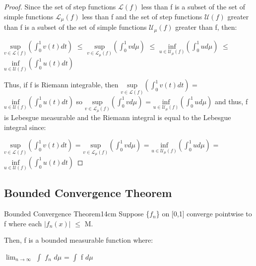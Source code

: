     \begin{proof}
        Since the set of step functions $\mathcal{L}(f)$ less than f is a subset of
        the set of simple functions $\mathcal{L}_{\mu}(f)$ less than f and
        the set of step functions $\mathcal{U}(f)$ greater than f is a subset of
        the set of simple functions $\mathcal{U}_{\mu}(f)$ greater than f, then:

        \hspace{0.5cm}
        $\underset{v \in \mathcal{L}(f)}{\text{sup}}(\int_0^1 v(t) dt)$
        $\leq$ $\underset{v \in \mathcal{L}_{\mu}(f)}{\text{sup}}(\int_0^1 v d\mu)$
        $\leq$ $\underset{u \in \mathcal{U}_{\mu}(f)}{\text{inf}}(\int_0^1 u d\mu)$
        $\leq$ $\underset{u \in \mathcal{U}(f)}{\text{inf}}(\int_0^1 u(t) dt)$

        Thus, if f is Riemann integrable,
        then
        $\underset{v \in \mathcal{L}(f)}{\text{sup}}(\int_0^1 v(t) dt)$
        = $\underset{u \in \mathcal{U}(f)}{\text{inf}}(\int_0^1 u(t) dt)$
        so $\underset{v \in \mathcal{L}_{\mu}(f)}{\text{sup}}(\int_0^1 v d\mu)$
        = $\underset{u \in \mathcal{U}_{\mu}(f)}{\text{inf}}(\int_0^1 u d\mu)$
        and thus, f is Lebesgue measurable
        and the Riemann integral is equal to the Lebesgue integral
        since:

        \hspace{0.5cm}
        $\underset{v \in \mathcal{L}(f)}{\text{sup}}(\int_0^1 v(t) dt)$
        = $\underset{v \in \mathcal{L}_{\mu}(f)}{\text{sup}}(\int_0^1 v d\mu)$
        = $\underset{u \in \mathcal{U}_{\mu}(f)}{\text{inf}}(\int_0^1 u d\mu)$
        = $\underset{u \in \mathcal{U}(f)}{\text{inf}}(\int_0^1 u(t) dt)$
    \end{proof}

    \vspace{0.5cm}



    

\subsection{ Bounded Convergence Theorem }

    \begin{wtheorem}{Bounded Convergence Theorem}{14cm}
        Suppose \{$f_n$\} on [0,1] converge pointwise to f where each
        $|f_n(x)|$ $\leq$ M.
        
        Then, f is a bounded measurable function where:
        
        \hspace{0.5cm}
        $\lim_{n \rightarrow \infty}$ $\int$ $f_n$ $d\mu$ = $\int$ f $d\mu$
    \end{wtheorem}

